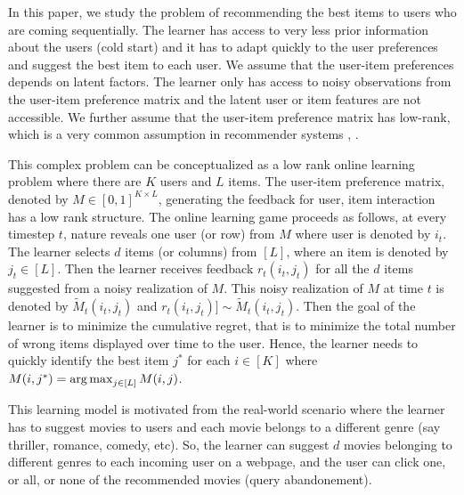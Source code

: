 In this paper, we study the problem of recommending the best items to users who are coming sequentially. The learner has access to very less prior information about the users (cold start) and it has to adapt quickly to the user preferences and suggest the best item to each user. We assume that the user-item preferences depends on latent factors. The learner only has access to noisy observations from the user-item preference matrix and the latent user or item features are not accessible. We further assume that the user-item preference matrix has low-rank, which is a very common assumption in recommender systems \citep{koren2009matrix}, \citep{ricci2011liorrokach}. %

	This complex problem can be conceptualized as a low rank online learning  problem where there are $K$ users and $L$ items. The user-item preference  matrix, denoted by $M\in [0,1]^{K\times L}$,  generating the feedback for user, item interaction has a low rank structure. The online learning game proceeds as follows, at every timestep $t$,  nature reveals one user (or row)  from $M$ where user is denoted by $i_t$. The learner selects $d$ items (or columns) from $[L]$, where an item is denoted by $j_t\in [L]$. Then the learner receives feedback $r_{t}(i_t,j_t)$ for all the $d$ items suggested from a noisy realization of $M$. This noisy realization of $M$ at time $t$ is denoted by $\tilde{M}_t(i_t,j_t)$ and  $r_{t}(i_t,j_t)] \sim \tilde{M}_t(i_t,j_t)$. Then the goal of the learner is to minimize the cumulative regret, that is to minimize the total number of wrong items displayed over time to the user. Hence, the learner needs to quickly identify the best item $j^*$ for each $i\in [K]$ where $M(i,j^*) = \mathop{\rm arg\,max} _{j\in[L]} M(i,j)$. 
	
	This learning model is motivated from the real-world scenario where the learner has  to suggest movies to users and each movie belongs to a different genre (say thriller, romance, comedy, etc). So, the learner can suggest $d$ movies belonging to different genres to each incoming user on a webpage, and the user can click one, or all, or none of the recommended movies (query abandonement). 	
	

	
